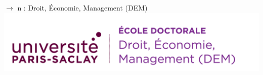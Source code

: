 \documentclass[french,12pt,a4paper]{book}
\begin{document}
\noindent \textbf{\color{Prune}$\rightarrow$} n : Droit, Économie, Management (DEM)\\
\includegraphics[scale=.7]{logo_usp_DEM.png}\\
\end{document}
